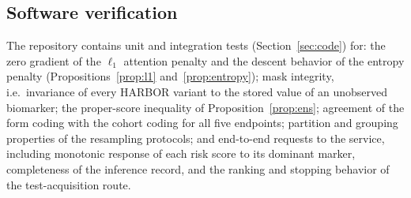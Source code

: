 \subsection{Software verification}
The repository contains unit and integration tests (Section~\ref{sec:code}) for: the zero gradient of the $\ell_1$ attention penalty and the descent behavior of the entropy penalty (Propositions~\ref{prop:l1} and~\ref{prop:entropy}); mask integrity, i.e.\ invariance of every HARBOR variant to the stored value of an unobserved biomarker; the proper-score inequality of Proposition~\ref{prop:ens}; agreement of the form coding with the cohort coding for all five endpoints; partition and grouping properties of the resampling protocols; and end-to-end requests to the service, including monotonic response of each risk score to its dominant marker, completeness of the inference record, and the ranking and stopping behavior of the test-acquisition route.
